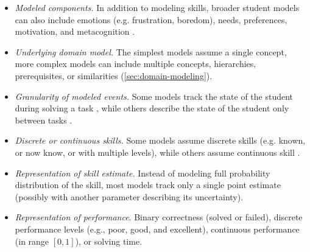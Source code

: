 \begin{itemize}
\item \emph{Modeled components.}
In addition to modeling skills, broader student models can also
include emotions (e.g. frustration, boredom), needs, preferences, motivation,
and metacognition \cite[ch.\,10]{affect-sensor-free,its-review-2010}.
\item \emph{Underlying domain model.}
The simplest models assume a single concept,
more complex models can include multiple concepts,
hierarchies, prerequisites, or similarities (\cref{sec:domain-modeling}).
\item \emph{Granularity of modeled events.}
Some models track the state of the student during solving a task
\cite{bkt, sqltutor}, %
while others describe the state of the student only between tasks %
\cite{kli-framework}. %
\item \emph{Discrete or continuous skills.}
Some models assume discrete skills (e.g. known, or now know, or with multiple levels),
while others assume continuous skill
\cite{pelanek-learner-modeling}.
\item \emph{Representation of skill estimate.}
Instead of modeling full probability distribution of the skill, %
most models track only a single point estimate
(possibly with another parameter describing its uncertainty).
\item \emph{Representation of performance}.
  Binary correctness (solved or failed),
  discrete performance levels (e.g., poor, good, and excellent),
  continuous performance (in range $[0, 1]$),
  or solving time.

\end{itemize}
